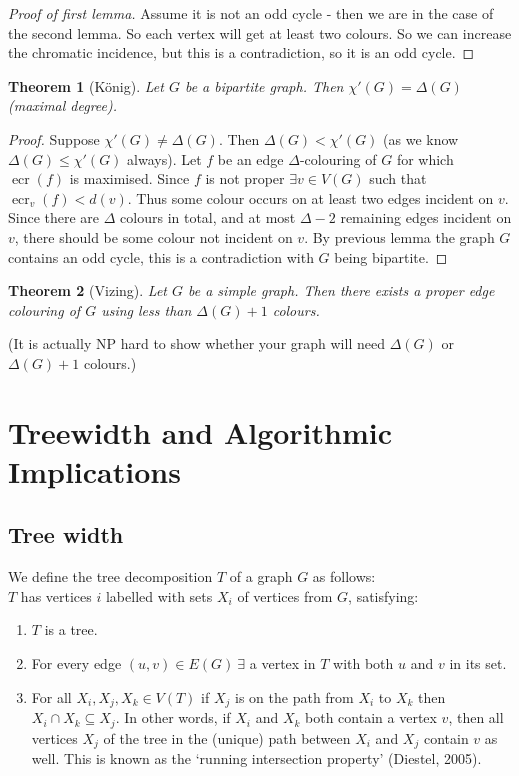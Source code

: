 \documentclass{article}
\newtheorem*{thm}{Theorem}
\theoremstyle{definition}
\DeclareMathOperator{\ecr}{ecr}
\begin{document}
\begin{proof}[Proof of first lemma]
Assume it is not an odd cycle - then we are in the case of the second lemma.
So each vertex will get at least two colours.
So we can increase the chromatic incidence, but this is a contradiction, so it is an odd cycle.
\end{proof}

\begin{thm}[K\"onig]
Let $G$ be a bipartite graph.
Then $\chi'(G) = \Delta(G)$ (maximal degree).
\end{thm}

\begin{proof}
Suppose $\chi'(G) \ne \Delta(G)$.
Then $\Delta(G) < \chi'(G)$ (as we know $\Delta(G) \le \chi'(G)$ always).
Let $f$ be an edge $\Delta$-colouring of $G$ for which $\ecr(f)$ is maximised.
Since $f$ is not proper $\exists v\in V(G)$ such that $\ecr_v(f) < d(v)$.
Thus some colour occurs on at least two edges incident on $v$.
Since there are $\Delta$ colours in total, and at most $\Delta-2$ remaining edges incident on $v$, there should be some colour not incident on $v$.
By previous lemma the graph $G$ contains an odd cycle, this is a contradiction with $G$ being bipartite.
\end{proof}

\begin{thm}[Vizing]
Let $G$ be a simple graph.
Then there exists a proper edge colouring of $G$ using less than $\Delta(G) + 1$ colours.
\end{thm}

(It is actually NP hard to show whether your graph will need $\Delta(G)$ or $\Delta(G) + 1$ colours.)


\section{Treewidth and Algorithmic Implications}

\subsection{Tree width}

We define the tree decomposition $T$ of a graph $G$ as follows: \\
$T$ has vertices $i$ labelled with sets $X_i$ of vertices from $G$, satisfying:
\begin{enumerate}
\item $T$ is a tree.
\item For every edge $(u,v)\in E(G)\ \exists$ a vertex in $T$ with both $u$ and $v$ in its set.
\item For all $X_i,X_j,X_k\in V(T)$ if $X_j$ is on the path from $X_i$ to $X_k$ then $X_i\cap X_k\subseteq X_j$. In other words, if $X_i$ and $X_k$ both contain a vertex $v$, then all vertices $X_j$ of the tree in the (unique) path between $X_i$ and $X_j$ contain $v$ as well. This is known as the `running intersection property' (Diestel, 2005).
\end{enumerate}
\end{document}
